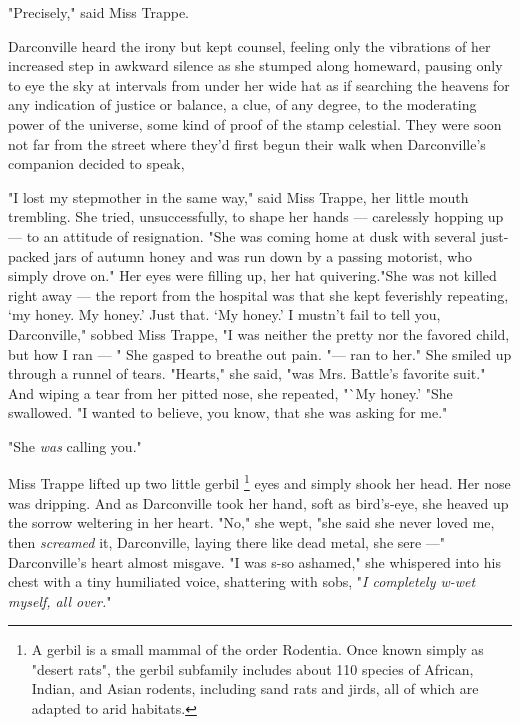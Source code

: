   "Precisely," said Miss Trappe.

  Darconville heard the irony but kept counsel, feeling only the vibrations of
her increased step in awkward silence as she stumped along homeward, pausing
only to eye the sky at intervals from under her wide hat as if searching the
heavens for any indication of justice or balance, a clue, of any degree, to the
moderating power of the universe, some kind of proof of the stamp celestial.
They were soon not far from the street where they'd first begun their walk when
Darconville's companion decided to speak,

  "I lost my stepmother in the same way," said Miss Trappe, her little mouth
trembling. She tried, unsuccessfully, to shape her hands --- carelessly hopping
up --- to an attitude of resignation. "She was coming home at dusk with several
just-packed jars of autumn honey and was run down by a passing motorist, who
simply drove on." Her eyes were filling up, her hat quivering."She was not
killed right away --- the report from the hospital was that she kept feverishly
repeating, `my honey. My honey.' Just that. `My honey.' I mustn't fail to tell
you, Darconville," sobbed Miss Trappe, "I was neither the pretty nor the favored
child, but how I ran --- " She gasped to breathe out pain. "--- ran to her."
She smiled up through a runnel 
of tears. "Hearts," she said, "was Mrs. Battle's
favorite suit." And wiping a tear from her pitted nose, she repeated, "`My 
honey.' "She swallowed. "I wanted to believe, you know, that she was asking for 
me."

  "She \textit{was} calling you."

  Miss Trappe lifted up two little gerbil 
\footnote{A gerbil is a small mammal of the order Rodentia. Once known simply
as "desert rats", the gerbil subfamily includes about 110 species of African,
Indian, and Asian rodents, including sand rats and jirds, all of which are
adapted to arid habitats. 
}
eyes and simply shook her head. Her nose was dripping. 
And as Darconville took her hand, soft as bird's-eye, she heaved 
up the sorrow weltering 
in her heart. "No," she wept, "she said she never
loved me, then \textit{screamed} it, Darconville, laying there like dead metal, 
she sere 
---" Darconville's heart almost misgave. 
"I was s-so ashamed," she whispered into his chest with a tiny humiliated 
voice, shattering with sobs, "\textit{I completely w-wet myself, all over.}"

